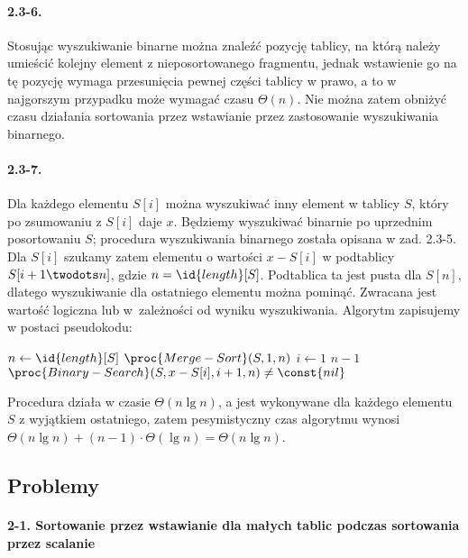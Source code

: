 \paragraph{2.3-6.}
Stosując wyszukiwanie binarne można znaleźć pozycję tablicy, na którą należy umieścić kolejny element z nieposortowanego fragmentu, jednak wstawienie go na tę pozycję wymaga przesunięcia pewnej części tablicy w prawo, a to w najgorszym przypadku może wymagać czasu $\Theta(n)$. Nie można zatem obniżyć czasu działania sortowania przez wstawianie przez zastosowanie wyszukiwania binarnego.

\paragraph{2.3-7.}
Dla każdego elementu $S[i]$ można wyszukiwać inny element w tablicy $S$, który po zsumowaniu z $S[i]$ daje $x$. Będziemy wyszukiwać binarnie po uprzednim posortowaniu $S$; procedura wyszukiwania binarnego została opisana w zad. \mbox{2.3-5}. Dla $S[i]$ szukamy zatem elementu o wartości $x-S[i]$ w podtablicy $S[i+1\twodots n]$, gdzie $n=\id{length}[S]$. Podtablica ta jest pusta dla $S[n]$, dlatego wyszukiwanie dla ostatniego elementu można pominąć. Zwracana jest wartość logiczna  lub  w~zależności od wyniku wyszukiwania. Algorytm zapisujemy w postaci pseudokodu:
\begin{codebox}
\li $n\gets \id{length}[S]$
\li $\proc{Merge-Sort}(S,1,n)$
\li \For $i\gets 1$ \To $n-1$
\li     \Do
            \If $\proc{Binary-Search}(S,x-S[i],i+1,n)\ne\const{nil}$
\li             \Then
                    \Return {}
                \End
        \End
\li \Return {}
\end{codebox}

Procedura  działa w czasie $\Theta(n\lg n)$, a  jest wykonywane dla każdego elementu $S$ z wyjątkiem ostatniego, zatem pesymistyczny czas algorytmu  wynosi $\Theta(n\lg n)+(n-1)\cdot\Theta(\lg n) = \Theta(n\lg n)$.

\subsection*{Problemy}

\paragraph{2-1. Sortowanie przez wstawianie dla małych tablic podczas sortowania przez scalanie}


